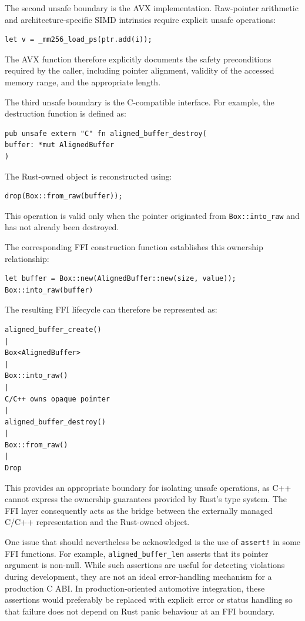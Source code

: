 The second unsafe boundary is the AVX implementation. Raw-pointer arithmetic and architecture-specific SIMD intrinsics 
require explicit unsafe operations:

\begin{lstlisting}[style=rustblock]
let v = _mm256_load_ps(ptr.add(i));
\end{lstlisting}

The AVX function therefore explicitly documents the safety preconditions required by the caller, 
including pointer alignment, validity of the accessed memory range, and the appropriate length.

The third unsafe boundary is the C-compatible interface. For example, the destruction function is defined as:

\begin{lstlisting}[style=rustblock]
pub unsafe extern "C" fn aligned_buffer_destroy(
buffer: *mut AlignedBuffer
)
\end{lstlisting}

The Rust-owned object is reconstructed using:

\begin{lstlisting}[style=rustblock]
drop(Box::from_raw(buffer));
\end{lstlisting}

This operation is valid only when the pointer originated from \lstinline|Box::into_raw| and has not already been destroyed.

The corresponding FFI construction function establishes this ownership relationship:

\begin{lstlisting}[style=rustblock]
let buffer = Box::new(AlignedBuffer::new(size, value));
Box::into_raw(buffer)
\end{lstlisting}

The resulting FFI lifecycle can therefore be represented as:

\begin{verbatim}
aligned_buffer_create()
|
Box<AlignedBuffer>
|
Box::into_raw()
|
C/C++ owns opaque pointer
|
aligned_buffer_destroy()
|
Box::from_raw()
|
Drop
\end{verbatim}

This provides an appropriate boundary for isolating unsafe operations, as C++ cannot express the ownership guarantees 
provided by Rust's type system. The FFI layer consequently acts as the bridge between the
externally managed C/C++ representation and the Rust-owned object.

One issue that should nevertheless be acknowledged is the use of \lstinline|assert!| in some FFI functions. 
For example, \lstinline|aligned_buffer_len| asserts that its pointer argument is non-null. 
While such assertions are useful for detecting violations during development, they are not an ideal error-handling 
mechanism for a production C ABI. In production-oriented automotive integration, these assertions would preferably be 
replaced with explicit error or status handling so that failure does not depend on Rust panic behaviour
at an FFI boundary.

